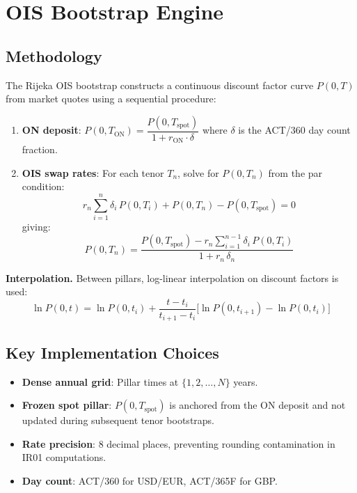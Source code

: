 \documentclass[11pt,a4paper]{article}
\begin{document}
\section{OIS Bootstrap Engine}

\subsection{Methodology}

The Rijeka OIS bootstrap constructs a continuous discount factor curve
$P(0,T)$ from market quotes using a sequential procedure:

\begin{enumerate}[leftmargin=2em]
  \item \textbf{ON deposit}: $P(0, T_\text{ON}) = \dfrac{P(0, T_\text{spot})}{1 + r_\text{ON} \cdot \delta}$
        where $\delta$ is the ACT/360 day count fraction.

  \item \textbf{OIS swap rates}: For each tenor $T_n$, solve for $P(0, T_n)$ from the
        par condition:
        \begin{equation}
          r_n \sum_{i=1}^{n} \delta_i \, P(0, T_i) + P(0, T_n) - P(0, T_\text{spot}) = 0
          \label{eq:ois-par}
        \end{equation}
        giving:
        \begin{equation}
          P(0, T_n) = \frac{P(0, T_\text{spot}) - r_n \sum_{i=1}^{n-1} \delta_i \, P(0, T_i)}{1 + r_n \, \delta_n}
        \end{equation}
\end{enumerate}

\noindent\textbf{Interpolation.} Between pillars, log-linear interpolation on
discount factors is used:
\begin{equation}
  \ln P(0,t) = \ln P(0,t_i) + \frac{t - t_i}{t_{i+1} - t_i} \bigl[\ln P(0,t_{i+1}) - \ln P(0,t_i)\bigr]
\end{equation}

\subsection{Key Implementation Choices}

\begin{itemize}[leftmargin=2em]
  \item \textbf{Dense annual grid}: Pillar times at $\{1, 2, \ldots, N\}$ years.
  \item \textbf{Frozen spot pillar}: $P(0, T_\text{spot})$ is anchored from the ON
        deposit and not updated during subsequent tenor bootstraps.
  \item \textbf{Rate precision}: 8 decimal places, preventing rounding contamination
        in IR01 computations.
  \item \textbf{Day count}: ACT/360 for USD/EUR, ACT/365F for GBP.
\end{itemize}
\end{document}
